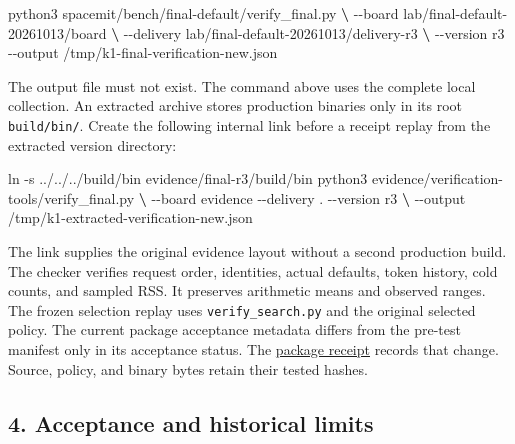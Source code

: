 \documentclass[10pt,a4paper]{article}
\newenvironment{Shaded}{}{}
\newcommand{\ExtensionTok}[1]{#1}
\newcommand{\FunctionTok}[1]{\textcolor[rgb]{0.02,0.16,0.49}{#1}}
\newcommand{\KeywordTok}[1]{\textcolor[rgb]{0.00,0.44,0.13}{\textbf{#1}}}
\newcommand{\NormalTok}[1]{#1}
\begin{document}
\begin{Shaded}
\begin{Highlighting}[]
\ExtensionTok{python3}\NormalTok{ spacemit/bench/final{-}default/verify\_final.py }\KeywordTok{\textbackslash{}}
  \ExtensionTok{{-}{-}board}\NormalTok{ lab/final{-}default{-}20261013/board }\KeywordTok{\textbackslash{}}
  \ExtensionTok{{-}{-}delivery}\NormalTok{ lab/final{-}default{-}20261013/delivery{-}r3 }\KeywordTok{\textbackslash{}}
  \ExtensionTok{{-}{-}version}\NormalTok{ r3 {-}{-}output /tmp/k1{-}final{-}verification{-}new.json}
\end{Highlighting}
\end{Shaded}

The output file must not exist. The command above uses the complete
local collection. An extracted archive stores production binaries only
in its root \nolinkurl{build/bin/}. Create the following internal link
before a receipt replay from the extracted version directory:

\begin{Shaded}
\begin{Highlighting}[]
\FunctionTok{ln}\NormalTok{ {-}s ../../../build/bin evidence/final{-}r3/build/bin}
\ExtensionTok{python3}\NormalTok{ evidence/verification{-}tools/verify\_final.py }\KeywordTok{\textbackslash{}}
  \ExtensionTok{{-}{-}board}\NormalTok{ evidence {-}{-}delivery . {-}{-}version r3 }\KeywordTok{\textbackslash{}}
  \ExtensionTok{{-}{-}output}\NormalTok{ /tmp/k1{-}extracted{-}verification{-}new.json}
\end{Highlighting}
\end{Shaded}

The link supplies the original evidence layout without a second
production build. The checker verifies request order, identities, actual
defaults, token history, cold counts, and sampled RSS. It preserves
arithmetic means and observed ranges. The frozen selection replay uses
\nolinkurl{verify_search.py} and the original selected policy. The
current package acceptance metadata differs from the pre-test manifest
only in its acceptance status. The
\href{https://github.com/MoyaMryia/riscv-accl/blob/main/spacemit/reports/raw/k1-final-default-20261014-r3/final-package-receipt.json}{package
receipt} records that change. Source, policy, and binary bytes retain
their tested hashes.

\hypertarget{acceptance-and-historical-limits}{%
\subsection{4. Acceptance and historical
limits}\label{acceptance-and-historical-limits}}
\end{document}
